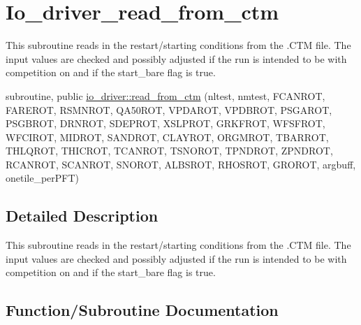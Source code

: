\hypertarget{group__io__driver__read__from__ctm}{}\section{Io\+\_\+driver\+\_\+read\+\_\+from\+\_\+ctm}
\label{group__io__driver__read__from__ctm}


This subroutine reads in the restart/starting conditions from the .C\+T\+M file. The input values are checked and possibly adjusted if the run is intended to be with competition on and if the start\+\_\+bare flag is true.  


\begin{DoxyCompactItemize}
\item 
subroutine, public \hyperlink{group__io__driver__read__from__ctm_ga754f9c8c8e4e916e436474006963eae9}{io\+\_\+driver\+::read\+\_\+from\+\_\+ctm} (nltest, nmtest, F\+C\+A\+N\+R\+O\+T, F\+A\+R\+E\+R\+O\+T, R\+S\+M\+N\+R\+O\+T, Q\+A50\+R\+O\+T, V\+P\+D\+A\+R\+O\+T, V\+P\+D\+B\+R\+O\+T, P\+S\+G\+A\+R\+O\+T, P\+S\+G\+B\+R\+O\+T, D\+R\+N\+R\+O\+T, S\+D\+E\+P\+R\+O\+T, X\+S\+L\+P\+R\+O\+T, G\+R\+K\+F\+R\+O\+T, W\+F\+S\+F\+R\+O\+T, W\+F\+C\+I\+R\+O\+T, M\+I\+D\+R\+O\+T, S\+A\+N\+D\+R\+O\+T, C\+L\+A\+Y\+R\+O\+T, O\+R\+G\+M\+R\+O\+T, T\+B\+A\+R\+R\+O\+T, T\+H\+L\+Q\+R\+O\+T, T\+H\+I\+C\+R\+O\+T, T\+C\+A\+N\+R\+O\+T, T\+S\+N\+O\+R\+O\+T, T\+P\+N\+D\+R\+O\+T, Z\+P\+N\+D\+R\+O\+T, R\+C\+A\+N\+R\+O\+T, S\+C\+A\+N\+R\+O\+T, S\+N\+O\+R\+O\+T, A\+L\+B\+S\+R\+O\+T, R\+H\+O\+S\+R\+O\+T, G\+R\+O\+R\+O\+T, argbuff, onetile\+\_\+per\+P\+F\+T)
\end{DoxyCompactItemize}


\subsection{Detailed Description}
This subroutine reads in the restart/starting conditions from the .C\+T\+M file. The input values are checked and possibly adjusted if the run is intended to be with competition on and if the start\+\_\+bare flag is true. 



\subsection{Function/\+Subroutine Documentation}
\hypertarget{group__io__driver__read__from__ctm_ga754f9c8c8e4e916e436474006963eae9}{}
